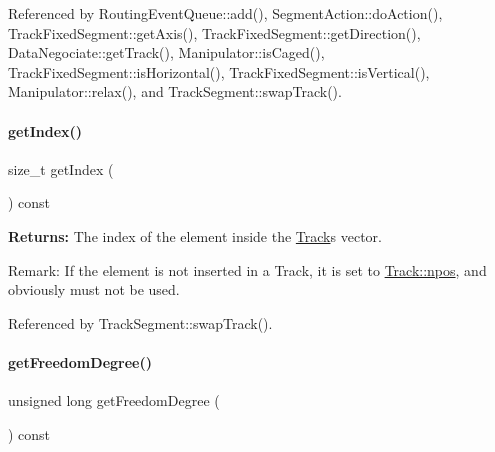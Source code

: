 Referenced by Routing\+Event\+Queue\+::add(), Segment\+Action\+::do\+Action(), Track\+Fixed\+Segment\+::get\+Axis(), Track\+Fixed\+Segment\+::get\+Direction(), Data\+Negociate\+::get\+Track(), Manipulator\+::is\+Caged(), Track\+Fixed\+Segment\+::is\+Horizontal(), Track\+Fixed\+Segment\+::is\+Vertical(), Manipulator\+::relax(), and Track\+Segment\+::swap\+Track().

\mbox{\label{classKite_1_1TrackElement_ad65a47a8b8a83be5d0b456b1074d1220}} 
\paragraph{\texorpdfstring{get\+Index()}{getIndex()}}
{\footnotesize\ttfamily size\+\_\+t get\+Index (\begin{DoxyParamCaption}{ }\end{DoxyParamCaption}) const\hspace{0.3cm}{\ttfamily [inline]}}

{\bfseries Returns\+:} The index of the element inside the \mbox{\hyperlink{classKite_1_1Track}{Track}}\textquotesingle{}s vector.

\begin{DoxyParagraph}{Remark\+: If the element is not inserted in a Track, it is set to}
\mbox{\hyperlink{classKite_1_1Track_ae0070ea45b2592ce3701ab9e486e58a0}{Track\+::npos}}, and obviously must not be used. 
\end{DoxyParagraph}


Referenced by Track\+Segment\+::swap\+Track().

\mbox{\label{classKite_1_1TrackElement_aa7552c20cc46abcac558627b2ca341f8}} 
\paragraph{\texorpdfstring{get\+Freedom\+Degree()}{getFreedomDegree()}}
{\footnotesize\ttfamily unsigned long get\+Freedom\+Degree (\begin{DoxyParamCaption}{ }\end{DoxyParamCaption}) const\hspace{0.3cm}{\ttfamily [virtual]}}

